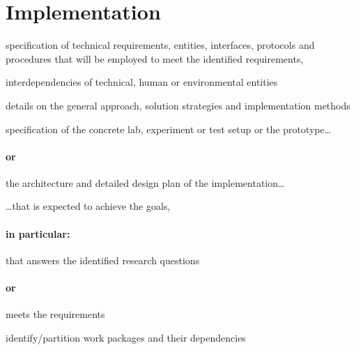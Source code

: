 \section{Implementation}
\label{chp:implementation}


\begin{shaded}
\noindent
specification of technical requirements, entities, interfaces, protocols and procedures that will be employed to meet the identified requirements,

\medskip
\noindent
interdependencies of technical, human or environmental entities
\end{shaded}


\begin{shaded}
\noindent details on the general approach, solution strategies and implementation methods

\vspace{5em}

\noindent specification of the concrete lab, experiment or test setup or the prototype\dots
\paragraph{or} the architecture and detailed design plan of the implementation\dots

\vspace{3em}

\noindent \dots that is expected to achieve the goals,
\paragraph{in particular:} that answers the identified research questions
\paragraph{or} meets the requirements

\vspace{5em}

\noindent identify/partition work packages and their dependencies
\end{shaded}


\lipsum[29-30]
